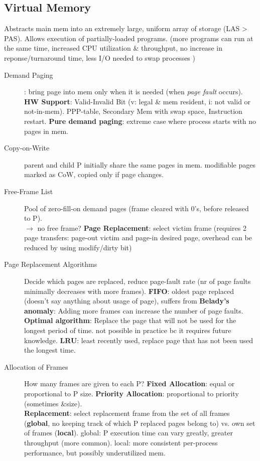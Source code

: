 \subsection*{Virtual Memory}
Abstracts main mem into an extremely large, uniform array of storage (LAS > PAS). Allows execution of partially-loaded programs. (more programs can run at the same time, increased CPU utilization \& throughput, no increase in reponse/turnaround time, less I/O needed to swap processes )
\begin{description}
    \item[Demand Paging]: bring page into mem only when it is needed (when \textit{page fault} occurs). \textbf{HW Support}: Valid-Invalid Bit (v: legal & mem resident, i: not valid or not-in-mem). PPP-table, Secondary Mem with swap space, Instruction restart. \textbf{Pure demand paging}: extreme case where process starts with no pages in mem.
    \item[Copy-on-Write]parent and child P initially share the same pages in mem. modifiable pages marked as CoW, copied only if page changes.
    \item[Free-Frame List]Pool of zero-fill-on demand pages (frame cleared with 0's, before released to P). \\
    $\rightarrow$ no free frame? \textbf{Page Replacement}: select victim frame (requires 2 page transfers: page-out victim and page-in desired page, overhead can be reduced by using modify/dirty bit) %
    \item[Page Replacement Algorithms] Decide which pages are replaced, reduce page-fault rate (nr of page faults minimally decreases with more frames). \textbf{FIFO}: oldest page replaced (doesn't say anything about usage of page), suffers from \textbf{Belady's anomaly}: Adding more frames can increase the number of page faults. \textbf{Optimal algorithm}: Replace the page that will not be used for the longest period of time. not possible in practice bc it  requires future knowledge. \textbf{LRU}: least recently used, replace page that has not been used the longest time.
    \item[Allocation of Frames]How many frames are given to each P? \textbf{Fixed Allocation}: equal or proportional to P size. \textbf{Priority Allocation}: proportional to priority (sometimes &size). \\
        \textbf{Replacement}: select replacement frame from the set of all frames (\textbf{global}, no keeping track of which P replaced pages belong to) vs. own set of frames (\textbf{local}). global: P execution time can vary greatly, greater throughput (more common). local: more consistent per-process performance, but possibly underutilized mem. %

\end{description}
